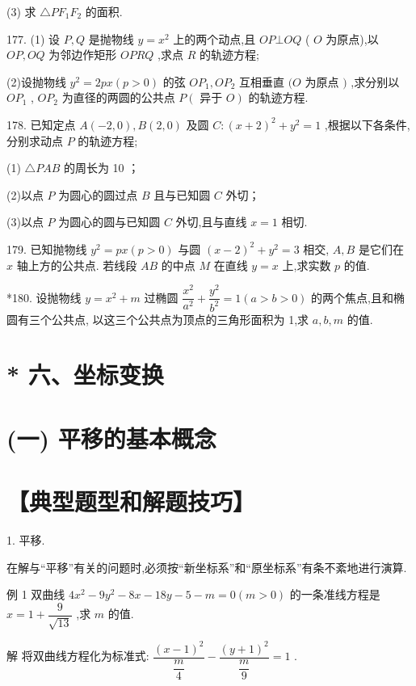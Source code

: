 (3) 求 $\bigtriangleup P{F}_{1}{F}_{2}$ 的面积.

177. (1) 设 $P,Q$ 是抛物线 $y = {x}^{2}$ 上的两个动点,且 ${OP} \bot  {OQ}$ ( $O$ 为原点),以 ${OP},{OQ}$ 为邻边作矩形 ${OPRQ}$ ,求点 $R$ 的轨迹方程;

(2)设抛物线 ${y}^{2} = {2px}\left( {p > 0}\right)$ 的弦 $O{P}_{1},O{P}_{2}$ 互相垂直 $(O$ 为原点 $)$ ,求分别以 $O{P}_{1}$ , $O{P}_{2}$ 为直径的两圆的公共点 $P\left( {\text{ 异于 }O}\right)$ 的轨迹方程.

178. 已知定点 $A\left( {-2,0}\right) ,B\left( {2,0}\right)$ 及圆 $C : {\left( x + 2\right) }^{2} + {y}^{2} = 1$ ,根据以下各条件,分别求动点 $P$ 的轨迹方程;

(1) $\bigtriangleup {PAB}$ 的周长为 10 ；

(2)以点 $P$ 为圆心的圆过点 $B$ 且与已知圆 $C$ 外切；

(3)以点 $P$ 为圆心的圆与已知圆 $C$ 外切,且与直线 $x = 1$ 相切.

179. 已知抛物线 ${y}^{2} = {px}\left( {p > 0}\right)$ 与圆 ${\left( x - 2\right) }^{2} + {y}^{2} = 3$ 相交, $A,B$ 是它们在 $x$ 轴上方的公共点. 若线段 ${AB}$ 的中点 $M$ 在直线 $y = x$ 上,求实数 $p$ 的值.

*180. 设抛物线 $y = {x}^{2} + m$ 过椭圆 $\dfrac{{x}^{2}}{{a}^{2}} + \dfrac{{y}^{2}}{{b}^{2}} = 1\left( {a > b > 0}\right)$ 的两个焦点,且和椭圆有三个公共点, 以这三个公共点为顶点的三角形面积为 1,求 $a,b,m$ 的值.

\section*{* 六、坐标变换}

\section*{(一) 平移的基本概念}

\section*{【典型题型和解题技巧】}

1. 平移.

在解与“平移”有关的问题时,必须按“新坐标系”和“原坐标系”有条不紊地进行演算.

例 1 双曲线 $4{x}^{2} - 9{y}^{2} - {8x} - {18y} - 5 - m = 0\left( {m > 0}\right)$ 的一条准线方程是 $x = 1 + \dfrac{9}{\sqrt{13}}$ ,求 $m$ 的值.

解 将双曲线方程化为标准式: $\dfrac{{\left( x - 1\right) }^{2}}{\dfrac{m}{4}} - \dfrac{{\left( y + 1\right) }^{2}}{\dfrac{m}{9}} = 1$ .

